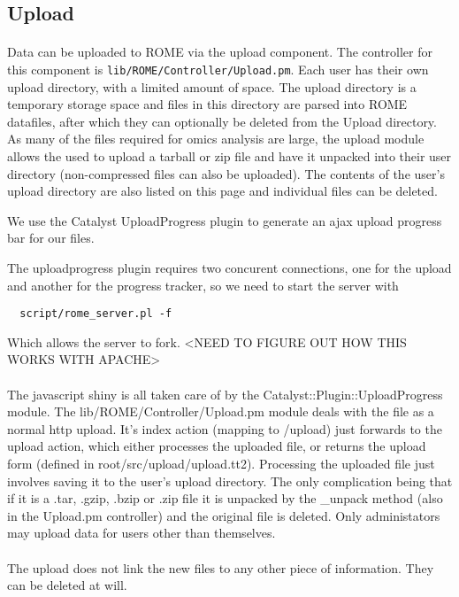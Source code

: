 \subsection{Upload}
\label{sec:upload}

\paragraph{}
Data can be uploaded to ROME via the upload component. The controller for this component is \texttt{lib/ROME/Controller/Upload.pm}. Each user has their own upload directory, with a limited amount of space. The upload directory is a temporary storage space and files in this directory are parsed into ROME datafiles, after which they can optionally be deleted from the Upload directory. As many of the files required for \-omics analysis are large, the upload module allows the used to upload a tarball or zip file and have it unpacked into their user directory (non-compressed files can also be uploaded). The contents of the user's upload directory are also listed on this page and individual files can be deleted.







We use the Catalyst UploadProgress plugin to generate an ajax upload progress bar for our files.

The uploadprogress plugin requires two concurent connections, one for the upload and another for the progress tracker, so we need to start the server with 

\begin{verbatim}
  script/rome_server.pl -f 
\end{verbatim}

Which allows the server to fork. <NEED TO FIGURE OUT HOW THIS WORKS WITH APACHE>

\paragraph*{}
The javascript shiny is all taken care of by the Catalyst::Plugin::UploadProgress module. The lib/ROME/Controller/Upload.pm module deals with the file as a normal http upload. It's index action (mapping to /upload) just forwards to the upload action, which either processes the uploaded file, or returns the upload form (defined in root/src/upload/upload.tt2). Processing the uploaded file just involves saving it to the user's upload directory. The only complication being that if it is a .tar, .gzip, .bzip or .zip file it is unpacked by the \_unpack method (also in the Upload.pm controller) and the original file is deleted. Only administators may upload data for users other than themselves.

\paragraph*{}
The upload does not link the new files to any other piece of information. They can be deleted at will.







